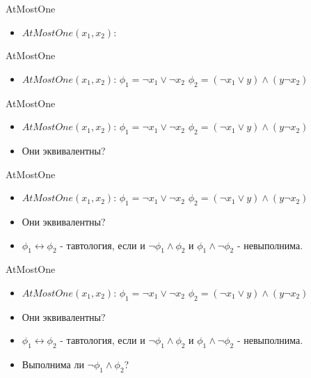 \documentclass{beamer}
\begin{document}
\begin{frame}{AtMostOne}
\begin{itemize}
\item $AtMostOne(x_1, x_2)$:\newline
\end{itemize}
\end{frame}

\begin{frame}{AtMostOne}
\begin{itemize}
\item $AtMostOne(x_1, x_2)$:\newline
$\phi_1 = \lnot x_1 \vee \lnot x_2$\newline
$\phi_2 = (\lnot x_1 \vee y) \wedge (y \lnot x_2)$\newline
\end{itemize}
\end{frame}

\begin{frame}{AtMostOne}
\begin{itemize}
\item $AtMostOne(x_1, x_2)$:\newline
$\phi_1 = \lnot x_1 \vee \lnot x_2$\newline
$\phi_2 = (\lnot x_1 \vee y) \wedge (y \lnot x_2)$\newline
\item Они эквивалентны?
\end{itemize}
\end{frame}

\begin{frame}{AtMostOne}
\begin{itemize}
\item $AtMostOne(x_1, x_2)$:\newline
$\phi_1 = \lnot x_1 \vee \lnot x_2$\newline
$\phi_2 = (\lnot x_1 \vee y) \wedge (y \lnot x_2)$\newline
\item Они эквивалентны?
\item $\phi_1 \leftrightarrow \phi_2$ - тавтология, если и $\lnot \phi_1 \wedge \phi_2$ и $\phi_1 \wedge \lnot \phi_2$ -
невыполнима.
\end{itemize}
\end{frame}

\begin{frame}{AtMostOne}
\begin{itemize}
\item $AtMostOne(x_1, x_2)$:\newline
$\phi_1 = \lnot x_1 \vee \lnot x_2$\newline
$\phi_2 = (\lnot x_1 \vee y) \wedge (y \lnot x_2)$\newline
\item Они эквивалентны?
\item $\phi_1 \leftrightarrow \phi_2$ - тавтология, если и $\lnot \phi_1 \wedge \phi_2$ и $\phi_1 \wedge \lnot \phi_2$ -
невыполнима.
\item Выполнима ли $\lnot \phi_1 \wedge \phi_2$?
\end{itemize}
\end{frame}
\end{document}
